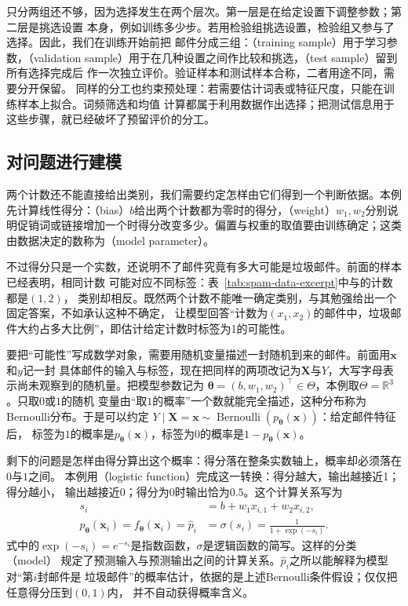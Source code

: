 只分两组还不够，因为选择发生在两个层次。第一层是在给定设置下调整参数；第二层是挑选设置
本身，例如训练多少步。若用检验组挑选设置，检验组又参与了选择。因此，我们在训练开始前把
邮件分成三组：（training sample）用于学习参数，（validation
sample）用于在几种设置之间作比较和挑选，（test sample）留到所有选择完成后
作一次独立评价。验证样本和测试样本合称，二者用途不同，需要分开保留。
同样的分工也约束预处理：若需要估计词表或特征尺度，只能在训练样本上拟合。词频筛选和均值
计算都属于利用数据作出选择；把测试信息用于这些步骤，就已经破坏了预留评价的分工。

\subsection{对问题进行建模}

两个计数还不能直接给出类别，我们需要约定怎样由它们得到一个判断依据。本例先计算线性得分：（bias）$b$给出两个计数都为零时的得分，（weight）$w_1,w_2$分别说明促销词或链接增加一个时得分改变多少。偏置与权重的取值要由训练确定；这类由数据决定的数称为（model parameter）。

不过得分只是一个实数，还说明不了邮件究竟有多大可能是垃圾邮件。前面的样本已经表明，相同计数
可能对应不同标签：表~\ref{tab:spam-data-excerpt}中与的计数都是$(1,2)$，
类别却相反。既然两个计数不能唯一确定类别，与其勉强给出一个固定答案，不如承认这种不确定，
让模型回答“计数为$(x_1,x_2)$的邮件中，垃圾邮件大约占多大比例”，即估计给定计数时标签为1的可能性。

要把“可能性”写成数学对象，需要用随机变量描述一封随机到来的邮件。前面用$\bm{x}$和$y$记一封
具体邮件的输入与标签，现在把同样的两项改记为$\bm{X}$与$Y$，大写字母表示尚未观察到的随机量。把模型参数记为
$\bm{\theta}=(b,w_1,w_2)^{\top}\in\Theta$，本例取$\Theta=\mathbb{R}^3$。只取$0$或$1$的随机
变量由“取$1$的概率”一个数就能完全描述，这种分布称为Bernoulli分布。于是可以约定
$Y\mid\bm{X}=\bm{x}\sim\operatorname{Bernoulli}(p_{\bm{\theta}}(\bm{x}))$：给定邮件特征后，
标签为$1$的概率是$p_{\bm{\theta}}(\bm{x})$，标签为$0$的概率是$1-p_{\bm{\theta}}(\bm{x})$。

剩下的问题是怎样由得分算出这个概率：得分落在整条实数轴上，概率却必须落在$0$与$1$之间。
本例用（logistic function）完成这一转换：得分越大，输出越接近1；得分越小，
输出越接近0；得分为$0$时输出恰为$0.5$。这个计算关系写为
\begin{align}
  s_i &= b+w_1x_{i,1}+w_2x_{i,2}, \\
  p_{\bm{\theta}}(\bm{x}_i)
  =f_{\bm{\theta}}(\bm{x}_i)
  =\hat{p}_i
  &=\sigma(s_i)=\frac{1}{1+\exp(-s_i)}.
  \label{eq:spam-model}
\end{align}
式中的$\exp(-s_i)=e^{-s_i}$是指数函数，$\sigma$是逻辑函数的简写。这样的分类（model）
规定了预测输入与预测输出之间的计算关系。$\hat{p}_i$之所以能解释为模型对“第$i$封邮件是
垃圾邮件”的概率估计，依据的是上述Bernoulli条件假设；仅仅把任意得分压到$(0,1)$内，
并不自动获得概率含义。

